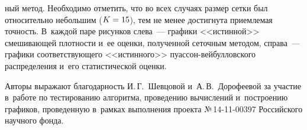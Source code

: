 \begin{multicols}{2}
\columnbreak

\noindent
ный метод. Необходимо отметить, что во всех случаях
размер сетки был относительно небольшим ($K\hm=15$), тем не менее
достигнута приемлемая точность. В~каждой паре рисунков слева~---
графики <<истинной>> смешивающей плотности и~ее оценки, полученной
сеточным методом, справа~--- графики соответствующего <<истинного>>
пуас\-сон-вей\-бул\-лов\-ско\-го распределения и~его статистической оценки.


Авторы выражают благодарность И.\,Г.~Шевцовой и~А.\,В.~Дорофеевой 
за участие в~работе по тес\-ти\-ро\-ва\-нию алгоритма, проведению вычислений\linebreak
 и~построению 
графиков, проведенную в~рамках выполнения проекта №\,14-11-00397 
Российского научного фонда.

\pagebreak




\end{multicols}

\begin{figure*} %
\vspace*{1pt}
\begin{center}
\mbox{%
\epsfxsize=163.372mm
}
\end{center}
\vspace*{-9pt}
\vspace*{12pt}
\begin{center}
\mbox{%
\epsfxsize=163.472mm
}
\end{center}
\vspace*{-9pt}
\end{figure*}

